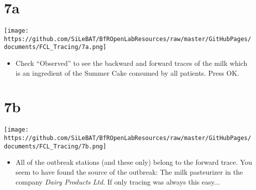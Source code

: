 \documentclass[10pt]{beamer}
\begin{document}
\section{7a}
\begin{frame}
	\begin{center}
			\texttt{[image: https://github.com/SiLeBAT/BfROpenLabResources/raw/master/GitHubPages/documents/FCL\_Tracing/7a.png]}
	\end{center}
	\begin{itemize}
		\item Check “Observed” to see the backward and forward traces of the milk which is an ingredient of the Summer Cake consumed by all patients. Press OK.
	\end{itemize}
\end{frame}

\section{7b}
\begin{frame}
	\begin{center}
			\texttt{[image: https://github.com/SiLeBAT/BfROpenLabResources/raw/master/GitHubPages/documents/FCL\_Tracing/7b.png]}
	\end{center}
	\begin{itemize}
		\item All of the outbreak stations (and these only) belong to the forward trace. You seem to have found the source of the outbreak: The milk pasteurizer in the company \textit{Dairy Products Ltd.} If only tracing was always this easy...
	\end{itemize}
	\end{frame}
\end{document}
